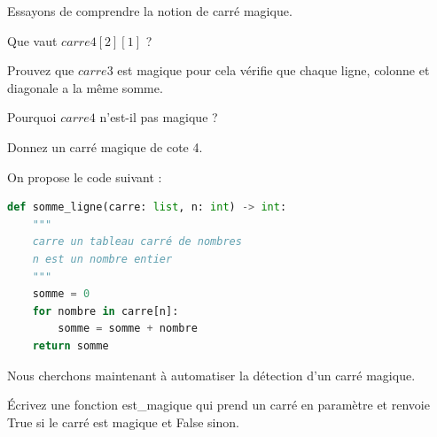 \documentclass[a4paper, noanswers, addpoints, 12pt]{exam}
\begin{document}
\begin{questions}
\question[4] Essayons de comprendre la notion de carré magique.
\begin{parts}
    \item Que vaut $carre4[2][1]$ ?
    \item Prouvez que $carre3$ est magique pour cela vérifie que chaque ligne, colonne et diagonale a la même somme.
    \item Pourquoi $carre4$ n'est-il pas magique ?
    \item Donnez un carré magique de cote 4.
\end{parts}

On propose le code suivant :
\begin{lstlisting}[language=Python]
def somme_ligne(carre: list, n: int) -> int:
    """
    carre un tableau carré de nombres
    n est un nombre entier
    """
    somme = 0
    for nombre in carre[n]:
        somme = somme + nombre
    return somme
\end{lstlisting}
\question[3] Nous cherchons maintenant à automatiser la détection d'un carré magique.


\question[2] [Bonus] Écrivez une fonction est\_magique qui prend un carré en paramètre et renvoie True si le carré est magique et False sinon.

\end{questions}
\end{document}
